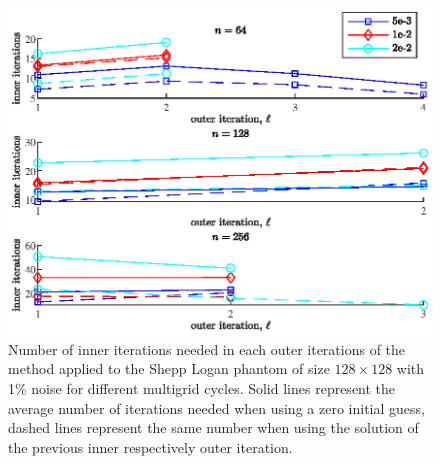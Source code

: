 \begin{figure}[htbp]
\begin{center}
\includegraphics{figures/zero_initial_guess_vs_previous_iteration}
\caption{Number of inner iterations needed in each outer iterations of the method applied to the Shepp Logan phantom of size $128 \times 128$ with 1\% noise for different multigrid cycles. Solid lines represent the average number of iterations needed when using a zero initial guess, dashed lines represent the same number when using the solution of the previous inner respectively outer iteration.}
\label{fig:zero_initial_guess_vs_previous_iteration}
\end{center}
\end{figure}

